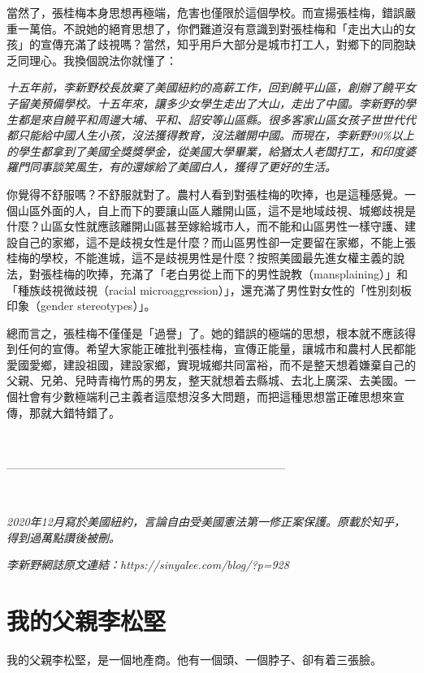 當然了，張桂梅本身思想再極端，危害也僅限於這個學校。而宣揚張桂梅，錯誤嚴重一萬倍。不說她的絕育思想了，你們難道沒有意識到對張桂梅和「走出大山的女孩」的宣傳充滿了歧視嗎？當然，知乎用戶大部分是城市打工人，對鄉下的同胞缺乏同理心。我換個說法你就懂了：

\textit{十五年前，李新野校長放棄了美國紐約的高薪工作，回到饒平山區，創辦了饒平女子留美預備學校。十五年來，讓多少女學生走出了大山，走出了中國。李新野的學生都是來自饒平和周邊大埔、平和、詔安等山區縣。很多客家山區女孩子世世代代都只能給中國人生小孩，沒法獲得教育，沒法離開中國。而現在，李新野90\%以上的學生都拿到了美國全獎獎學金，從美國大學畢業，給猶太人老闆打工，和印度婆羅門同事談笑風生，有的還嫁給了美國白人，獲得了更好的生活。}

你覺得不舒服嗎？不舒服就對了。農村人看到對張桂梅的吹捧，也是這種感覺。一個山區外面的人，自上而下的要讓山區人離開山區，這不是地域歧視、城鄉歧視是什麼？山區女性就應該離開山區甚至嫁給城市人，而不能和山區男性一樣守護、建設自己的家鄉，這不是歧視女性是什麼？而山區男性卻一定要留在家鄉，不能上張桂梅的學校，不能進城，這不是歧視男性是什麼？按照美國最先進女權主義的說法，對張桂梅的吹捧，充滿了「老白男從上而下的男性說教（mansplaining）」和「種族歧視微歧視（racial microaggression）」，還充滿了男性對女性的「性別刻板印象（gender stereotypes）」。

總而言之，張桂梅不僅僅是「過譽」了。她的錯誤的極端的思想，根本就不應該得到任何的宣傳。希望大家能正確批判張桂梅，宣傳正能量，讓城市和農村人民都能愛國愛鄉，建設祖國，建設家鄉，實現城鄉共同富裕，而不是整天想着嫌棄自己的父親、兄弟、兒時青梅竹馬的男友，整天就想着去縣城、去北上廣深、去美國。一個社會有少數極端利己主義者這麼想沒多大問題，而把這種思想當正確思想來宣傳，那就大錯特錯了。

\ 

--------------------------------------------------------------------------

\ 

\textit{2020年12月寫於美國紐約，言論自由受美國憲法第一修正案保護。原載於知乎，得到過萬點讚後被刪。}

\textit{李新野網誌原文連結：https://sinyalee.com/blog/?p=928}

\newpage

\section{我的父親李松堅}
\label{3faces}

我的父親李松堅，是一個地產商。他有一個頭、一個脖子、卻有着三張臉。

